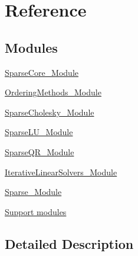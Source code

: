 \hypertarget{group___sparse___reference}{}\section{Reference}
\label{group___sparse___reference}
\subsection*{Modules}
\begin{DoxyCompactItemize}
\item 
\hyperlink{group___sparse_core___module}{Sparse\+Core\+\_\+\+Module}
\item 
\hyperlink{group___ordering_methods___module}{Ordering\+Methods\+\_\+\+Module}
\item 
\hyperlink{group___sparse_cholesky___module}{Sparse\+Cholesky\+\_\+\+Module}
\item 
\hyperlink{group___sparse_l_u___module}{Sparse\+L\+U\+\_\+\+Module}
\item 
\hyperlink{group___sparse_q_r___module}{Sparse\+Q\+R\+\_\+\+Module}
\item 
\hyperlink{group___iterative_linear_solvers___module}{Iterative\+Linear\+Solvers\+\_\+\+Module}
\item 
\hyperlink{group___sparse___module}{Sparse\+\_\+\+Module}
\item 
\hyperlink{group___support__modules}{Support modules}
\end{DoxyCompactItemize}


\subsection{Detailed Description}
